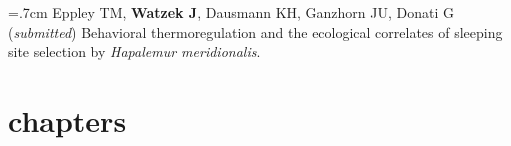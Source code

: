 \documentclass[]{friggeri-cv}
\begin{document}
\hangindent=.7cm Eppley TM, \textbf{Watzek J}, Dausmann KH, Ganzhorn JU, Donati G (\emph{submitted}) Behavioral thermoregulation and the ecological correlates of sleeping site selection by \emph{Hapalemur meridionalis}.\\[-.1cm]











\section{chapters}
\end{document}
